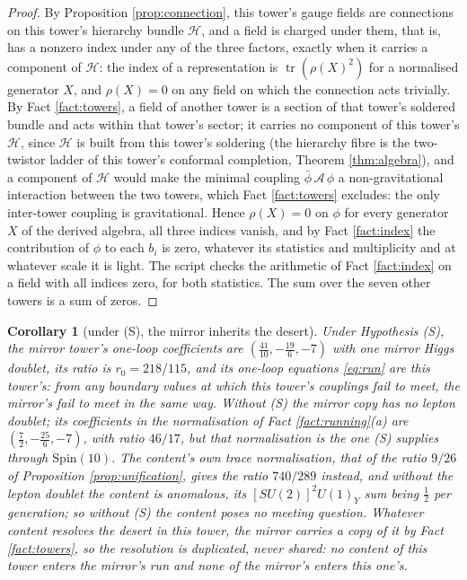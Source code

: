 \documentclass[11pt]{article}
\newtheorem{corollary}[theorem]{Corollary}
\theoremstyle{definition}
\newcommand{\tr}{\operatorname{tr}}
\begin{document}
\begin{proof}
By Proposition \ref{prop:connection}, this tower's gauge fields are connections on this tower's hierarchy bundle $\mathcal{H}$, and a field is charged under them, that is, has a nonzero index under any of the three factors, exactly when it carries a component of $\mathcal{H}$: the index of a representation is $\tr(\rho(X)^{2})$ for a normalised generator $X$, and $\rho(X) = 0$ on any field on which the connection acts trivially. By Fact \ref{fact:towers}, a field of another tower is a section of that tower's soldered bundle and acts within that tower's sector; it carries no component of this tower's $\mathcal{H}$, since $\mathcal{H}$ is built from this tower's soldering (the hierarchy fibre is the two-twistor ladder of this tower's conformal completion, Theorem \ref{thm:algebra}), and a component of $\mathcal{H}$ would make the minimal coupling $\bar{\phi}\,\mathcal{A}\,\phi$ a non-gravitational interaction between the two towers, which Fact \ref{fact:towers} excludes: the only inter-tower coupling is gravitational. Hence $\rho(X) = 0$ on $\phi$ for every generator $X$ of the derived algebra, all three indices vanish, and by Fact \ref{fact:index} the contribution of $\phi$ to each $b_{i}$ is zero, whatever its statistics and multiplicity and at whatever scale it is light. The script checks the arithmetic of Fact \ref{fact:index} on a field with all indices zero, for both statistics. The sum over the seven other towers is a sum of zeros.
\end{proof}

\begin{corollary}[under (S), the mirror inherits the desert]\label{cor:mirror}
Under Hypothesis (S), the mirror tower's one-loop coefficients are $(\tfrac{41}{10}, -\tfrac{19}{6}, -7)$ with one mirror Higgs doublet, its ratio is $r_{0} = 218/115$, and its one-loop equations \eqref{eq:run} are this tower's: from any boundary values at which this tower's couplings fail to meet, the mirror's fail to meet in the same way. Without (S) the mirror copy has no lepton doublet; its coefficients in the normalisation of Fact \ref{fact:running}(a) are $(\tfrac72, -\tfrac{25}{6}, -7)$, with ratio $46/17$, but that normalisation is the one (S) supplies through $\mathrm{Spin}(10)$. The content's own trace normalisation, that of the ratio $9/26$ of Proposition \ref{prop:unification}, gives the ratio $740/289$ instead, and without the lepton doublet the content is anomalous, its $[SU(2)]^{2}U(1)_{Y}$ sum being $\tfrac12$ per generation; so without (S) the content poses no meeting question. Whatever content resolves the desert in this tower, the mirror carries a copy of it by Fact \ref{fact:towers}, so the resolution is duplicated, never shared: no content of this tower enters the mirror's run and none of the mirror's enters this one's.
\end{corollary}
\end{document}

